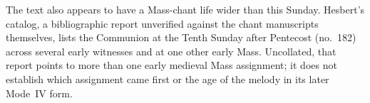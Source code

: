 The text also appears to have a Mass-chant life wider than this Sunday.
Hesbert's catalog, a bibliographic report unverified against the chant
manuscripts themselves, lists the Communion at the Tenth Sunday after
Pentecost (no.~182) across several early witnesses and at one other early
Mass. Uncollated, that report points to more than one early medieval Mass
assignment; it does not establish which assignment came first or the age of
the melody in its later Mode~IV form.
